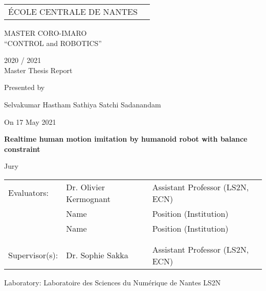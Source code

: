 \thispagestyle{empty}

\def\lskip{\vspace{0.5cm}}


\begin{tabular}{p{7cm}p{8cm}}
ÉCOLE CENTRALE DE NANTES
&
\end{tabular}

\vspace{2cm}

\begin{center} \large\sc MASTER CORO-IMARO\\ \normalsize{``CONTROL and ROBOTICS''} \end{center}



\begin{center}
	2020 / 2021\\
	\lskip
	Master Thesis Report %
	\lskip
	
	Presented by \lskip 
	
	Selvakumar Hastham Sathiya Satchi Sadanandam \lskip
	
	On 17 May 2021 \lskip\lskip
	
	{\Large \textbf{Realtime human motion imitation by humanoid robot with balance constraint}}
	
	\vfill

Jury \lskip
		
	\end{center}
	


\begin{tabular}{p{3cm}p{5cm}p{7cm} }
 Evaluators: & Dr. Olivier Kermognant & Assistant Professor (LS2N, ECN) \\
	      & Name & Position (Institution) \\ 
	      & Name & Position (Institution) \\ & & \\  & & \\ 
  Supervisor(s):  & Dr. Sophie Sakka & Assistant Professor (LS2N, ECN) \\
\end{tabular}

\lskip

\begin{flushleft}
 Laboratory: Laboratoire des Sciences du Numérique de Nantes LS2N
\end{flushleft}

\newpage
\thispagestyle{empty}
\null
\newpage
\addtocounter{page}{-1}
\pagestyle{fancy}
